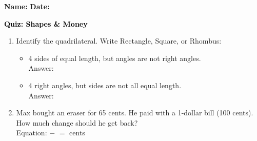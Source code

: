 \documentclass[12pt, letterpaper, fleqn]{article}
\newcommand{\blank}{\underline{\hspace{2.2cm}}}
\begin{document}
\textbf{Name:} \underline{\hspace{5cm}}
\hfill
\textbf{Date:} \underline{\hspace{3cm}}\\

\begin{tcolorbox}[colback=customteal!20]
    \large\textcolor{black}{\textbf{Quiz: Shapes \& Money}}
\end{tcolorbox}

\vspace{5mm}
\begin{enumerate}[itemsep=3cm, leftmargin=0.6cm]
\item Identify the quadrilateral. Write Rectangle, Square, or Rhombus:
  \begin{itemize}[itemsep=1cm]
    \item 4 sides of equal length, but angles are not right angles. \\ Answer: \blank
    \item 4 right angles, but sides are not all equal length. \\ Answer: \blank
  \end{itemize}

\item Max bought an eraser for 65 cents. He paid with a 1-dollar bill (100 cents). How much change should he get back?
\\
Equation: \blank $-$ \blank $=$ \blank cents
\end{enumerate}
\end{document}
